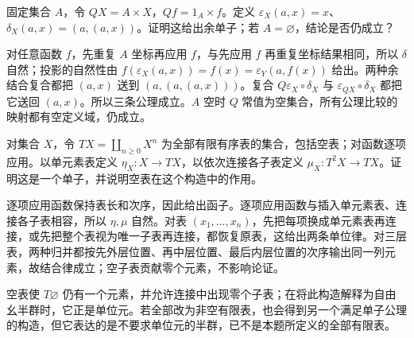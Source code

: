 \begin{exercise}\label{b4:ex:03-product-comonad}
	固定集合 \(A\)，令 \(QX=A\times X\)，\(Qf=1_A\times f\)。定义 \(\varepsilon_X(a,x)=x\)、\(\delta_X(a,x)=(a,(a,x))\)。证明这给出余单子；若 \(A=\varnothing\)，结论是否仍成立？
\end{exercise}
\begin{solution}
	对任意函数 \(f\)，先重复 \(A\) 坐标再应用 \(f\)，与先应用 \(f\) 再重复坐标结果相同，所以 \(\delta\) 自然；投影的自然性由 \(f(\varepsilon_X(a,x))=f(x)=\varepsilon_Y(a,f(x))\) 给出。两种余结合复合都把 \((a,x)\) 送到 \((a,(a,(a,x)))\)。复合 \(Q\varepsilon_X\circ\delta_X\) 与 \(\varepsilon_{QX}\circ\delta_X\) 都把它送回 \((a,x)\)。所以三条公理成立。\(A\) 空时 \(Q\) 常值为空集合，所有公理比较的映射都有空定义域，仍成立。
\end{solution}

\begin{exercise}\label{b4:ex:03-list-monad}
	对集合 \(X\)，令 \(TX=\coprod_{n\ge0}X^n\) 为全部有限有序表的集合，包括空表；对函数逐项应用。以单元素表定义 \(\eta_X:X\rightarrow TX\)，以依次连接各子表定义 \(\mu_X:T^2X\rightarrow TX\)。证明这是一个单子，并说明空表在这个构造中的作用。
\end{exercise}
\begin{solution}
	逐项应用函数保持表长和次序，因此给出函子。逐项应用函数与插入单元素表、连接各子表相容，所以 \(\eta,\mu\) 自然。对表 \((x_1,\ldots,x_n)\)，先把每项换成单元素表再连接，或先把整个表视为唯一子表再连接，都恢复原表，这给出两条单位律。对三层表，两种归并都按先外层位置、再中层位置、最后内层位置的次序输出同一列元素，故结合律成立；空子表贡献零个元素，不影响论证。

	空表使 \(T\varnothing\) 仍有一个元素，并允许连接中出现零个子表；在将此构造解释为自由幺半群时，它正是单位元。若全部改为非空有限表，也会得到另一个满足单子公理的构造，但它表达的是不要求单位元的半群，已不是本题所定义的全部有限表。
\end{solution}

